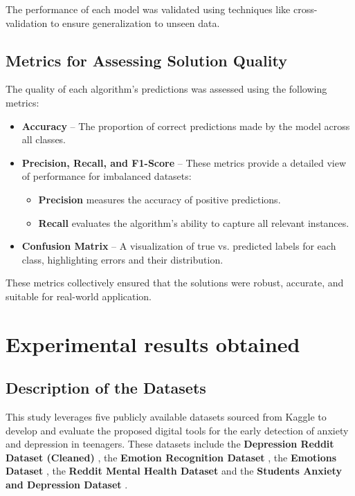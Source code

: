 \documentclass[runningheads,a4paper,11pt]{report}
\begin{document}
The performance of each model was validated using techniques like cross-validation to ensure generalization to unseen data.

\section{Metrics for Assessing Solution Quality}
\label{section:metrics_quality}

The quality of each algorithm's predictions was assessed using the following metrics:
\begin{itemize}
    \item \textbf{Accuracy} -- The proportion of correct predictions made by the model across all classes.
    \item \textbf{Precision, Recall, and F1-Score} -- These metrics provide a detailed view of performance for imbalanced datasets:
    \begin{itemize}
        \item \textbf{Precision} measures the accuracy of positive predictions.
        \item \textbf{Recall} evaluates the algorithm's ability to capture all relevant instances.
    \end{itemize}
    \item \textbf{Confusion Matrix} -- A visualization of true vs. predicted labels for each class, highlighting errors and their distribution.
    
\end{itemize}

These metrics collectively ensured that the solutions were robust, accurate, and suitable for real-world application.



\chapter{Experimental results obtained}
\label{chapter:experimental-results}

\section{Description of the Datasets}
\label{section:description}
This study leverages five publicly available datasets sourced from Kaggle to develop and evaluate the proposed digital tools for the early detection of anxiety and depression in teenagers. These datasets include the \textbf{Depression Reddit Dataset (Cleaned)} \cite{depression_reddit_cleaned}, the \textbf{Emotion Recognition Dataset} \cite{emotion_dataset}, the \textbf{Emotions Dataset} \cite{emotions}, the \textbf{Reddit Mental Health Dataset} \cite{reddit_dataset} and the \textbf{Students Anxiety and Depression Dataset} \cite{students_anxiety_depression}. 
\end{document}
